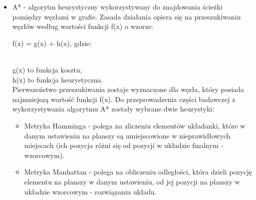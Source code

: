 \documentclass{classrep}
\begin{document}
{\begin{itemize}
  \item A* - algorytm heurystyczny wykorzystywany do znajdowania ścieżki pomiędzy węzłami w grafie. Zasada działania opiera się na przeszukiwaniu węzłów według wartości funkcji f(x) o wzorze:\\ \centerline{ f(x) = g(x) + h(x), gdzie: }\\ g(x) to funkcja kosztu,\\ h(x) to funkcja heurystyczna.\\ Pierwszeństwo przeszukiwania zostaje wyznaczone dla węzła, który posiada najmniejszą wartość funkcji f(x).
Do przeprowadzenia części badawczej z wykorzystywania algorytmu A* zostały wybrane dwie heurystyki:
  \begin{itemize}
  \item Metryka Hamminga - polega na zliczeniu elementów układanki, które w danym ustawieniu na planszy są umiejscowione w nieprawidłowych miejscach (ich pozycja różni się od pozycji w układzie finalnym - wzorcowym).
  \item Metryka Manhattan - polega na obliczeniu odległości, która dzieli pozycję elementu na planszy w danym ustawieniu, od jej pozycji na planszy w układzie wzorcowym - rozwiązaniu układu.
  \end{itemize}
\end{itemize}

}
\end{document}

